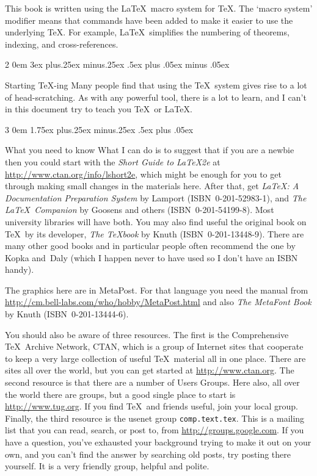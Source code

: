 \documentclass[titlepage]{article}
\makeatletter
\renewcommand{\subsection}{\@startsection{subsection}%
  {2}%
  {0em}%
  {3ex plus.25ex minus.25ex}%
  {.5ex plus .05ex minus .05ex}%
  {\large\bfseries\raggedright}}
\renewcommand{\subsubsection}{\@startsection{subsubsection}%
  {3}%
  {0em}%
  {1.75ex plus.25ex minus.25ex}%
  {.5ex plus .05ex}%
  {\bfseries\raggedright}}
\makeatother
\begin{document}
This book is written using the \LaTeX\ macro system for \TeX. 
The `macro system' modifier means that commands have been added to 
make it easier to use the underlying \TeX.
For example, \LaTeX\ simplifies the numbering of theorems, indexing,
and cross-references.



\subsection{Starting \TeX-ing}
Many people find that using the \TeX\ system gives rise to
a lot of head-scratching.
As with any powerful tool, there is a lot to learn, and 
I can't in this document try to teach you \TeX\ or \LaTeX. 



\subsubsection{What you need to know}
What I can do is to suggest that if you are a newbie then
you could start with the 
\textit{Short Guide to \LaTeX2e} at
\url{http://www.ctan.org/info/lshort2e}, which might be enough
for you to get through making small changes in the materials here.
After that, get 
\textit{\LaTeX: A Documentation Preparation System}
by Lamport (ISBN~0-201-52983-1), and 
\textit{The \LaTeX\ Companion}
by Goosens and others (ISBN~0-201-54199-8).
Most university libraries will have both.
You may also find useful the original book on \TeX\ by its developer,
\textit{The \TeX book}
by Knuth (ISBN~0-201-13448-9).
There are many other good books and in particular people often
recommend the one by Kopka and~Daly (which I happen never to have used
so I don't have an ISBN handy).

The graphics here are in MetaPost.
For that language you need the manual from
\url{http://cm.bell-labs.com/who/hobby/MetaPost.html} 
and also \textit{The MetaFont Book} by Knuth
(ISBN~0-201-13444-6).

You should also be aware of three resources.
The first is the Comprehensive \TeX\ Archive Network, CTAN, which
is a group of Internet sites that cooperate to keep a very large
collection of useful \TeX\ material all in one place.
There are sites all over the world, but you can get started
at \url{http://www.ctan.org}.
The second resource is that there are a number of Users Groups.
Here also, all over the world there are groups, but a good single place 
to start is \url{http://www.tug.org}.
If you find \TeX\ and friends useful, join your local group.
Finally, the third resource is the usenet group \texttt{comp.text.tex}.
This is a mailing list that you can read, search, or post to, from
\url{http://groups.google.com}.
If you have a question, you've exhausted your background trying 
to make it out on your own, and you can't find the answer by searching
old posts, try posting there yourself.
It is a very friendly group, helpful and polite.
\end{document}
